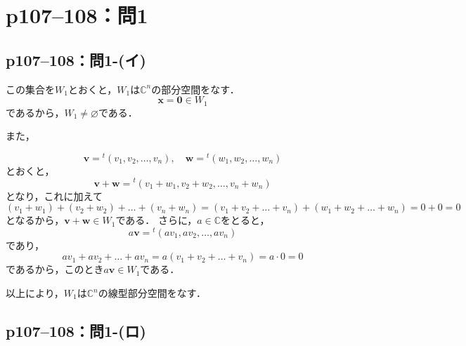 \documentclass[a4paper,10pt,fleqn]{ltjsarticle}
\begin{document}
\newpage
\section*{p107--108：問1}


\subsection*{p107--108：問1-(イ)}


\begin{tleftbar}
    この集合を$W_1$とおくと，$W_1$は$\mathbb{C}^n$の部分空間をなす．
    \[
        \bm{x} =\bm{0} \in  W_1
    \]
    であるから，$W_1 \ne \varnothing$である．

    また，

    \[
        \bm{v} = {}^t ( v_{1} , v_{2} , \ldots ,v_{n} ) , \quad \bm{w} = {}^t (w_{1} , w_{2} , \ldots , w_{n} )
    \]
    とおくと，
    \[
        \bm{v}+\bm{w}={}^t (v_1+w_1,v_2+w_2,\ldots,v_n + w_n)
    \]
    となり，これに加えて
    \[
        ( v_1+w_1)+(v_2+w_2) + \dots + (v_n + w_n) =(v_1+v_2+\dots + v_n ) + (w_1+w_2+\dots + w_n )=0+0=0
    \]
    となるから，$\bm{v}+\bm{w} \in W_1$である．
    さらに，$a \in \mathbb{C}$をとると，
    \[
        a \bm{v}={}^t ( av_{1} ,av_{2} , \ldots , av_{n} )
    \]
    であり，
    \[
        av_1 + av_2+ \dots + av_n = a (v_1 + v_2 + \dots + v_n) = a \cdot 0 =0
    \]
    であるから，このとき$ a \bm{v} \in W_1$である．

    以上により，$W_1$は$\mathbb{C}^n$の線型部分空間をなす．
\end{tleftbar}


\subsection*{p107--108：問1-(ロ)}
\end{document}

